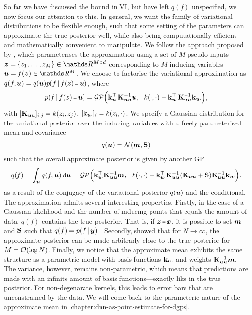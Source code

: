 So far we have discussed the bound in VI, but have left $q(f)$ unspecified, we now focus our attention to this. In general, we want the family of variational distributions to be flexible enough, such that some setting of the parameters can approximate the true posterior well, while also being computationally efficient and mathematically convenient to manipulate. %
We follow the approach proposed by \citet{titsias2009}, which parameterises the approximation using a set of $M$ pseudo inputs $\vz = \{z_1, \ldots, z_M\} \in \Reals^{M \times d}$ corresponding to $M$ inducing variables $\vu = f(\vz) \in \Reals^M$. 
We choose to factorise the variational approximation as $q(f, \vu) = q(\vu) p(f\given f(\vz) \shorteq \vu)$, where
\begin{equation}
  p(f \given f(\vz) \shorteq \vu) = \GP\Big(\kux^\top \Kuu^{-1}\vu,\ \ k(\cdot, \cdot) -  \kux^\top \Kuu^{-1} \kux\Big), 
\end{equation}
with $[\mathbf{{K}}_{\bm{u} \bm{u}}]_{i,j} = k(z_i, z_j)$, $[\mathbf{k}_{\bm{u} \cdot}]_i = k(z_i, \cdot)$. We specify a Gaussian distribution for the variational posterior over the inducing variables with a freely parameterised mean and covariance
\begin{equation}
  q(\vu) = \NormDist{\vm, \MS}
\end{equation}
such that the overall approximate posterior is given by another GP
\begin{equation}
  \label{eq:qf}
  q(f) = \int_{\bm{u}} q(f, \bm{u})\,\mathrm{d}{\bm{u}} = \mathcal{GP}\Big(\mathbf{k}_{\bm{u} \cdot}^\top \mathbf{{K}}_{\bm{u} \bm{u}}^{-1}\bm{m},\ \ k(\cdot, \cdot) -  \mathbf{k}_{\bm{u} \cdot}^\top \mathbf{{K}}_{\bm{u} \bm{u}}^{-1} (\mathbf{{K}}_{\bm{u} \bm{u}} + \mathbf{{S}})\mathbf{{K}}_{\bm{u} \bm{u}}^{-1} \mathbf{k}_{\bm{u} \cdot}\Big).
\end{equation}
as a result of the conjugacy of the variational posterior $q(\bm{u})$ and the conditional. 
The approximation admits several interesting properties. Firstly, in the case of a Gaussian likelihood and the number of inducing points that equals the amount of data, $q(f)$ contains the true posterior. That is, if $\vz \shorteq \vx$, it is possible to set $\bm{m}$ and $\mathbf{{S}}$ such that $q(f) = p(f \,|\, \bm{y})$ \citep{titsias2009}. Secondly, \citet{burt2019} showed that for $N \rightarrow \infty$, the approximate posterior can be made arbitrarly close to the true posterior for $M = \mathcal{O}(\log N)$. Finally, we notice that the approximate mean exhibits the same structure as a parametric model with basis functions $\mathbf{k}_{\bm{u} \cdot}$ and weights $\mathbf{{K}}_{\bm{u} \bm{u}}^{-1} \bm{m}$. The variance, however, remains non-parametric, which means that predictions are made with an infinite amount of basis functions---exactly like in the true posterior. For non-degenarate kernels, this leads to error bars that are unconstrained by the data. We will come back to the parameteric nature of the approximate mean in \cref{chapter:dnn-as-point-estimate-for-dgps}.


